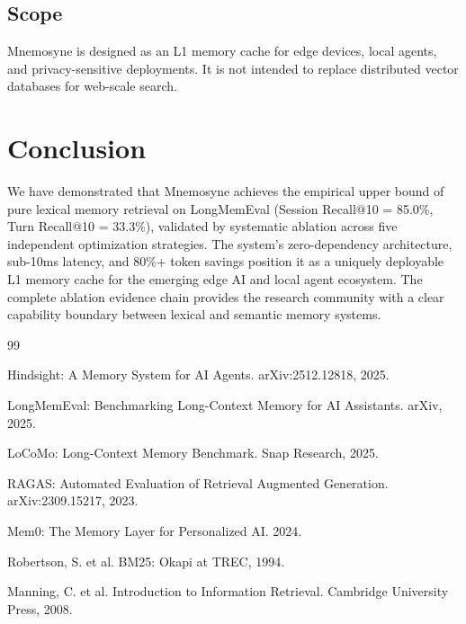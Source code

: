 \documentclass[11pt,a4paper]{article}
\begin{document}
\subsection{Scope}

Mnemosyne is designed as an L1 memory cache for edge devices, local agents, and privacy-sensitive deployments. It is not intended to replace distributed vector databases for web-scale search.

\section{Conclusion}

We have demonstrated that Mnemosyne achieves the empirical upper bound of pure lexical memory retrieval on LongMemEval (Session Recall@10 = 85.0\%, Turn Recall@10 = 33.3\%), validated by systematic ablation across five independent optimization strategies. The system's zero-dependency architecture, sub-10ms latency, and 80\%+ token savings position it as a uniquely deployable L1 memory cache for the emerging edge AI and local agent ecosystem. The complete ablation evidence chain provides the research community with a clear capability boundary between lexical and semantic memory systems.

\begin{thebibliography}{99}

Hindsight: A Memory System for AI Agents. arXiv:2512.12818, 2025.

LongMemEval: Benchmarking Long-Context Memory for AI Assistants. arXiv, 2025.

LoCoMo: Long-Context Memory Benchmark. Snap Research, 2025.

RAGAS: Automated Evaluation of Retrieval Augmented Generation. arXiv:2309.15217, 2023.

Mem0: The Memory Layer for Personalized AI. 2024.

Robertson, S. et al. BM25: Okapi at TREC, 1994.

Manning, C. et al. Introduction to Information Retrieval. Cambridge University Press, 2008.

\end{thebibliography}
\end{document}

